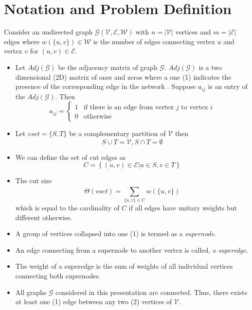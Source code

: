\documentclass[longpaper, english, final, times]{revdetua}
\begin{document}
	\section{Notation and Problem Definition}
		Consider an undirected graph $\mathcal{G(V,E,W)}$ with $n=|\mathcal{\mathcal{V}}|$ vertices and $m=|\mathcal{E}|$ edges where $w(\{u,v\}) \in \mathcal{W}$ is the number of edges connecting vertex $u$ and vertex $v$ for $(u,v)\in \mathcal{E}$. 
		\begin{itemize}
			\item Let $Adj(\mathcal{G})$ be the adjacency matrix of graph $\mathcal{G}$. $Adj(\mathcal{G})$ is a two dimensional (2D) matrix of ones and zeros where a one (1) indicates the presence of the corresponding edge in the network \cite{adjacencymatrixdefinition}. Suppose $a_{ij}$ is an entry of the $Adj(\mathcal{G})$. Then
			\[
				a_{ij} = 
				\begin{cases} 
					1 & \text{if there is an edge from vertex } j \text{ to vertex } i \\
					0 & \text{otherwise} 
				\end{cases}
			\] 
			\item Let  $vset=\{S, T\}	$ be a complementary partition of $\mathcal{V}$ then
					\[
						S\cup T = \mathcal{V} , S\cap T=\emptyset
					\]
			\item We can define the set of cut edges as
				\[
					C=\left\{(u,v) \in \mathcal{E} | u \in S, v \in T \right\}
				\]
			\item The cut size 
				\[
					\Theta(vset) = \sum_{\{u,v\}\in C}^{} w(\{u,v\})
				\]
				which is equal to the cardinality of $C$ if all edges have unitary weights but different otherwise.
			\item A group of vertices collapsed into one (1) is termed as a \textit{supernode}.
			\item An edge connecting from a supernode to another vertex is called, a \textit{superedge}.
			\item The weight of a superedge is the sum of weights of all individual vertices connecting both supernodes. 
			\item All graphs $\mathcal{G}$ considered in this presentation are connected. Thus, there exists at least one (1) edge between any two (2) vertices of $\mathcal{V}$. 
		\end{itemize}
	
\end{document}

